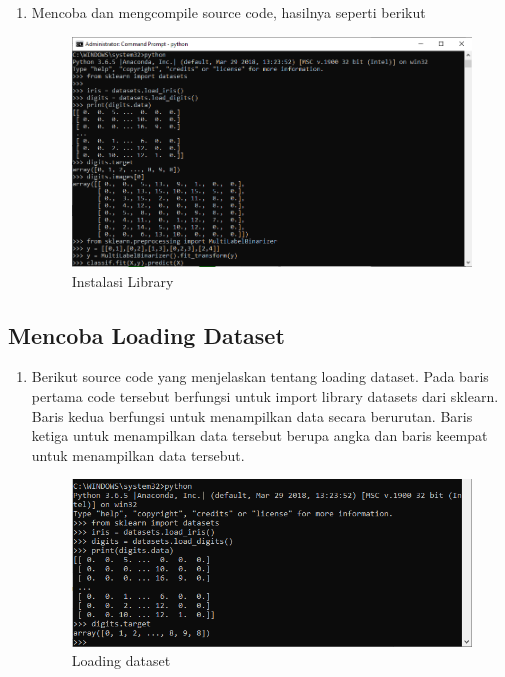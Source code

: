 \begin{enumerate}
\item Mencoba dan mengcompile source code, hasilnya seperti berikut
\begin{figure}[ht]
\centering
\includegraphics[scale=0.5]{figures/19.png}
\caption{Instalasi Library}
\end{figure}
\end{enumerate}

\subsection{Mencoba Loading Dataset}
\begin{enumerate}
\item Berikut source code yang menjelaskan tentang loading dataset. Pada baris pertama code tersebut berfungsi untuk import library datasets dari sklearn. Baris kedua berfungsi untuk menampilkan data secara berurutan. Baris ketiga untuk menampilkan data tersebut berupa angka dan baris keempat untuk menampilkan data tersebut.
\begin{figure}[ht]
\centering
\includegraphics[scale=0.5]{figures/20.png}
\caption{Loading dataset}
\end{figure}
\end{enumerate}


